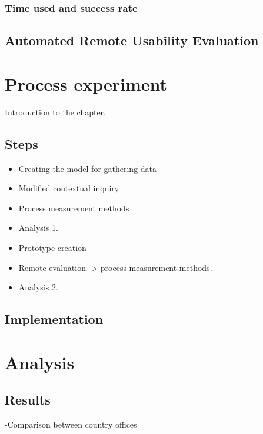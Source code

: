 \documentclass[12pt,a4paper,oneside,pdftex]{report}
\begin{document}
        \subsection{Time used and success rate}

\section{Automated Remote Usability Evaluation}
\label{sec:rue}
 
    

    
\chapter{Process experiment}
\label{processexperiment}
Introduction to the chapter.

    \section{Steps}
    \label{sec:steps}
        \begin{itemize}
            \item Creating the model for gathering data
            \item Modified contextual inquiry 
            \item Process measurement methods
            \item Analysis 1.
            \item Prototype creation
            \item Remote evaluation -> process measurement methods.
            \item Analysis 2.
        \end{itemize}

    \section{Implementation}
    \label{sec:implementation}
    
\chapter{Analysis}
\label{chapter:analysis}

    \section{Results}
    \label{sec:results}
    -Comparison between country offices
\end{document}
